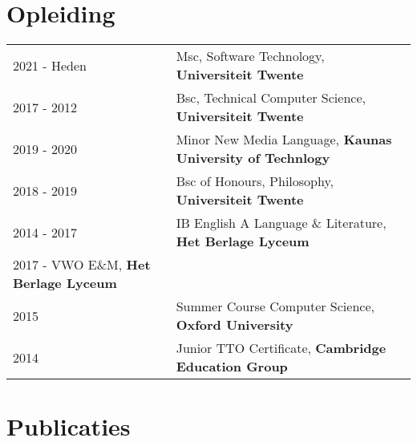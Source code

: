 \documentclass[a4paper,12pt]{article}
\begin{document}
\section{Opleiding}
\begin{tabularx}{\linewidth}{@{}l X@{}}	
2021 - Heden & Msc, Software Technology, \textbf{Universiteit Twente} \\

2017 - 2012 & Bsc, Technical Computer Science, \textbf{Universiteit Twente} \\ 

2019 - 2020 & Minor New Media Language, \textbf{Kaunas University of Technlogy} \\

2018 - 2019 & Bsc of Honours, Philosophy, \textbf{Universiteit Twente} \\

2014 - 2017 & IB English A Language \& Literature, \textbf{Het Berlage Lyceum} \\

2017 - VWO E\&M, \textbf{Het Berlage Lyceum} \\

2015 & Summer Course Computer Science, \textbf{Oxford University} \\

2014 & Junior TTO Certificate, \textbf{Cambridge Education Group} \\
\end{tabularx}

\section{Publicaties}
\begin{refsection}
\nocite{*}
\printbibliography[heading=none]
\end{refsection}

\end{document}
